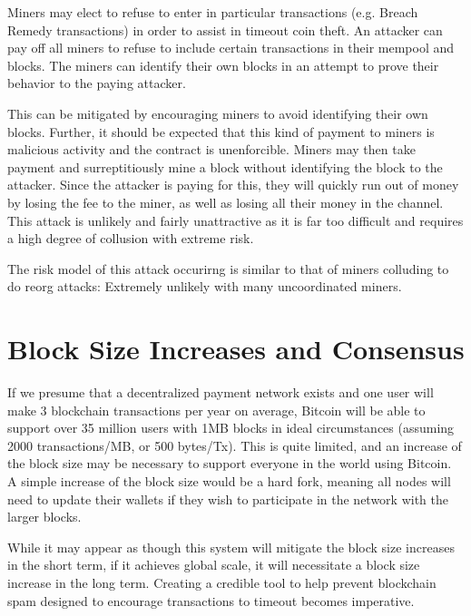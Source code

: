 \documentclass[letterpaper,11pt]{article}
\begin{document}
Miners may elect to refuse to enter in particular transactions (e.g. Breach
Remedy transactions) in order to assist in timeout coin theft. An attacker can
pay off all miners to refuse to include certain transactions in their mempool
and blocks. The miners can identify their own blocks in an attempt to prove
their behavior to the paying attacker.

This can be mitigated by encouraging miners to avoid identifying their own
blocks. Further, it should be expected that this kind of payment to miners is
malicious activity and the contract is unenforcible. Miners may then take
payment and surreptitiously mine a block without identifying the block to the
attacker. Since the attacker is paying for this, they will quickly run out of
money by losing the fee to the miner, as well as losing all their money in the
channel. This attack is unlikely and fairly unattractive as it is far too
difficult and requires a high degree of collusion with extreme risk.

The risk model of this attack occurirng is similar to that of miners colluding
to do reorg attacks: Extremely unlikely with many uncoordinated miners.

\section{Block Size Increases and Consensus}

If we presume that a decentralized payment network exists and one user will make
3 blockchain transactions per year on average, Bitcoin will be able to support
over 35 million users with 1MB blocks in ideal circumstances (assuming 2000
transactions/MB, or 500 bytes/Tx). This is quite limited, and an increase of the
block size may be necessary to support everyone in the world using Bitcoin. A
simple increase of the block size would be a hard fork, meaning all nodes will
need to update their wallets if they wish to participate in the network with the
larger blocks.

While it may appear as though this system will mitigate the block size increases
in the short term, if it achieves global scale, it will necessitate a block size
increase in the long term. Creating a credible tool to help prevent blockchain
spam designed to encourage transactions to timeout becomes imperative.
\end{document}
